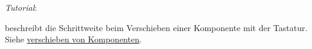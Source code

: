 \emph{Tutorial}:

 beschreibt die Schrittweite beim Verschieben einer Komponente
mit der Tastatur. Siehe \href{\#verschiebenVonKomponenten}{verschieben von
Komponenten}.
